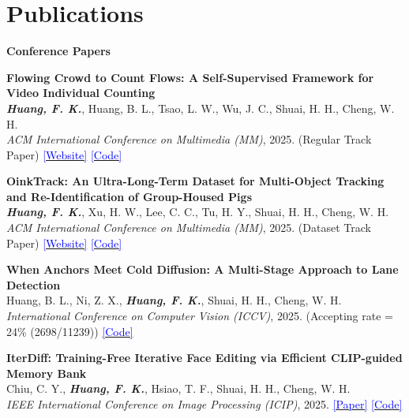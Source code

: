 \section{\textbf{Publications}}
\vspace{1mm}
\noindent \textbf{\large Conference Papers}
\vspace{-2.5mm}

 \resumeItemListStart 
    \item{
        \textbf{Flowing Crowd to Count Flows: A Self-Supervised Framework for Video Individual Counting} \\
        \textit{\textbf{Huang, F. K.}}, Huang, B. L., Tsao, L. W., Wu, J. C., Shuai, H. H., Cheng, W. H. \\
        \textit{ACM International Conference on Multimedia (MM)}, 2025. (Regular Track Paper) \href{https://leohuang0511.github.io/vic-ssl/}{\textcolor{Blue}{[Website]}} \href{https://github.com/LeoHuang0511/VICSSL}{\textcolor{Blue}{[Code]}}
    }
    
    \item{
        \textbf{OinkTrack: An Ultra-Long-Term Dataset for Multi-Object Tracking and Re-Identification of Group-Housed Pigs} \\
        \textit{\textbf{Huang, F. K.}}, Xu, H. W., Lee, C. C., Tu, H. Y., Shuai, H. H., Cheng, W. H. \\
        \textit{ACM International Conference on Multimedia (MM)}, 2025. (Dataset Track Paper) \href{https://leohuang0511.github.io/oinktrack-page/}{\textcolor{Blue}{[Website]}} \href{https://github.com/LeoHuang0511/OinkTrack}{\textcolor{Blue}{[Code]}}
    }
    
    \item{
        \textbf{When Anchors Meet Cold Diffusion: A Multi-Stage Approach to Lane Detection} \\
        Huang, B. L., Ni, Z. X., \textit{\textbf{Huang, F. K.}}, Shuai, H. H., Cheng, W. H. \\
        \textit{International Conference on Computer Vision (ICCV)}, 2025. (Accepting rate = 24\% (2698/11239)) \href{https://github.com/ntudr/CDiffLane}{\textcolor{Blue}{[Code]}}
    }
    
    \item{
        \textbf{IterDiff: Training-Free Iterative Face Editing via Efficient CLIP-guided Memory Bank} \\
        Chiu, C. Y., \textit{\textbf{Huang, F. K.}}, Hsiao, T. F., Shuai, H. H., Cheng, W. H. \\
        \textit{IEEE International Conference on Image Processing (ICIP)}, 2025. \href{https://basiclab.lab.nycu.edu.tw/assets/IterDiff.pdf}{\textcolor{Blue}{[Paper]}} \href{https://github.com/david20571015/IterDiff}{\textcolor{Blue}{[Code]}}
    }
    
